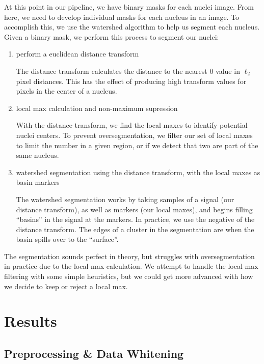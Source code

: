 \documentclass[paper=letter, fontsize=12pt]{article}
\numberwithin{equation}{section} %
\numberwithin{figure}{section} %
\numberwithin{table}{section} %
\begin{document}
At this point in our pipeline, we have binary masks for each nuclei image.
From here, we need to develop individual masks for each nucleus in an image.  
To accomplish this, we use the watershed algorithm to help us segment each 
nucleus.  Given a binary mask, we perform this process to segment our nuclei:
\begin{enumerate}
    \item perform a euclidean distance transform

        The distance transform calculates the distance to the nearest 0 value
        in $\ell_2$ pixel distances.  This has the effect of producing high 
        transform values for pixels in the center of a nucleus.

    \item local max calculation and non-maximum supression

        With the distance transform, we find the local maxes to identify
        potential nuclei centers.  To prevent oversegmentation, we filter our
        set of local maxes to limit the number in a given region, or if we
        detect that two are part of the same nucleus.

    \item watershed segmentation using the distance transform, with the local
        maxes as basin markers

        The watershed segmentation works by taking samples of a signal (our
        distance transform), as well as markers (our local maxes), and begins
        filling ``basins'' in the signal at the markers.  In practice, we use
        the negative of the distance transform.  The edges of a cluster in the
        segmentation are when the basin spills over to the ``surface''.
\end{enumerate}

The segmentation sounds perfect in theory, but struggles with oversegmentation
in practice due to the local max calculation.  We attempt to handle the local
max filtering with some simple heuristics, but we could get more advanced with
how we decide to keep or reject a local max.

\section{Results}

\subsection{Preprocessing \& Data Whitening}
\end{document}
